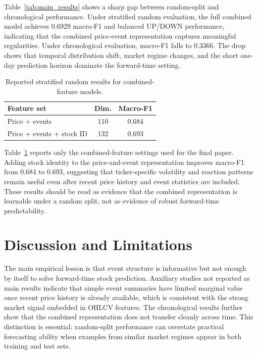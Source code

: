 \documentclass[sigconf,review]{acmart}
\begin{document}
Table~\ref{tab:main_results} shows a sharp gap between random-split and chronological performance. Under stratified random evaluation, the full combined model achieves 0.6929 macro-F1 and balanced UP/DOWN performance, indicating that the combined price-event representation captures meaningful regularities. Under chronological evaluation, macro-F1 falls to 0.3366. The drop shows that temporal distribution shift, market regime changes, and the short one-day prediction horizon dominate the forward-time setting.

\begin{table}[t]
\caption{Reported stratified random results for combined-feature models.}
\label{tab:ablation}
\centering
\small
\begin{tabular}{lcc}
\toprule
Feature set & Dim. & Macro-F1 \\
\midrule
Price + events & 110 & 0.684 \\
Price + events + stock ID & 132 & 0.693 \\
\bottomrule
\end{tabular}
\end{table}

Table~\ref{tab:ablation} reports only the combined-feature settings used for the final paper. Adding stock identity to the price-and-event representation improves macro-F1 from 0.684 to 0.693, suggesting that ticker-specific volatility and reaction patterns remain useful even after recent price history and event statistics are included. These results should be read as evidence that the combined representation is learnable under a random split, not as evidence of robust forward-time predictability.

\section{Discussion and Limitations}

The main empirical lesson is that event structure is informative but not enough by itself to solve forward-time stock prediction. Auxiliary studies not reported as main results indicate that simple event summaries have limited marginal value once recent price history is already available, which is consistent with the strong market signal embedded in OHLCV features. The chronological results further show that the combined representation does not transfer cleanly across time. This distinction is essential: random-split performance can overstate practical forecasting ability when examples from similar market regimes appear in both training and test sets.
\end{document}
